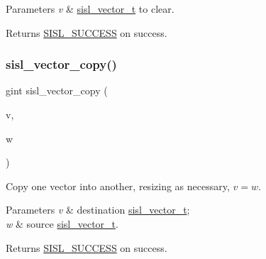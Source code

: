 \begin{DoxyParams}{Parameters}
{\em v} & \mbox{\hyperlink{group__vector_gacbac585492f5005f05f0c0b8463039be}{sisl\+\_\+vector\+\_\+t}} to clear.\\
\hline
\end{DoxyParams}
\begin{DoxyReturn}{Returns}
\mbox{\hyperlink{group__status_gga82c112a16803c9ddebc065a1b0f16287a60b9f04752a2c4dd6214f8a4fd7d913b}{S\+I\+S\+L\+\_\+\+S\+U\+C\+C\+E\+SS}} on success. 
\end{DoxyReturn}
\mbox{\label{group__vector_ga782dc0e416aadf242dc5c06d5c078347}} 
\subsubsection{\texorpdfstring{sisl\+\_\+vector\+\_\+copy()}{sisl\_vector\_copy()}}
{\footnotesize\ttfamily gint sisl\+\_\+vector\+\_\+copy (\begin{DoxyParamCaption}\item[{\mbox{\hyperlink{group__vector_gacbac585492f5005f05f0c0b8463039be}{sisl\+\_\+vector\+\_\+t}} $\ast$}]{v,  }\item[{\mbox{\hyperlink{group__vector_gacbac585492f5005f05f0c0b8463039be}{sisl\+\_\+vector\+\_\+t}} $\ast$}]{w }\end{DoxyParamCaption})}

Copy one vector into another, resizing as necessary, $v=w$.


\begin{DoxyParams}{Parameters}
{\em v} & destination \mbox{\hyperlink{group__vector_gacbac585492f5005f05f0c0b8463039be}{sisl\+\_\+vector\+\_\+t}}; \\
\hline
{\em w} & source \mbox{\hyperlink{group__vector_gacbac585492f5005f05f0c0b8463039be}{sisl\+\_\+vector\+\_\+t}}.\\
\hline
\end{DoxyParams}
\begin{DoxyReturn}{Returns}
\mbox{\hyperlink{group__status_gga82c112a16803c9ddebc065a1b0f16287a60b9f04752a2c4dd6214f8a4fd7d913b}{S\+I\+S\+L\+\_\+\+S\+U\+C\+C\+E\+SS}} on success. 
\end{DoxyReturn}
\mbox{\label{group__vector_ga9b8e2a9fbb00ada96f0d327da88f5c64}} 
